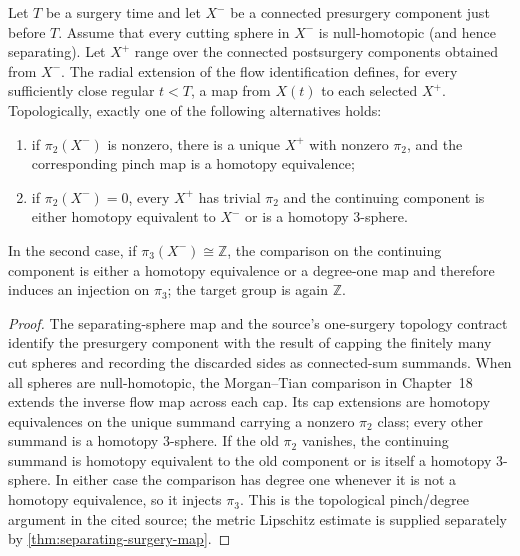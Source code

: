\begin{lemma}
\label{lem:null-sphere-surgery-topological-comparison}
\notready
Let $T$ be a surgery time and let $X^-$ be a connected presurgery
component just before $T$.  Assume that every cutting sphere in $X^-$ is
null-homotopic (and hence separating).  Let $X^+$ range over the connected
postsurgery components obtained from $X^-$.  The radial extension of the
flow identification defines, for every sufficiently close regular
$t<T$, a map from $X(t)$ to each selected $X^+$.  Topologically, exactly one
of the following alternatives holds:
\begin{enumerate}
\item if $\pi _2(X^-)$ is nonzero, there is a unique $X^+$ with nonzero
      $\pi _2$, and the corresponding pinch map is a homotopy equivalence;
\item if $\pi _2(X^-)=0$, every $X^+$ has trivial $\pi _2$ and the
      continuing component is either homotopy equivalent to $X^-$ or is a
      homotopy $3$-sphere.
\end{enumerate}
In the second case, if $\pi _3(X^-)\cong\mathbb Z$, the comparison on the
continuing component is either a homotopy equivalence or a degree-one map
and therefore induces an injection on $\pi _3$; the target group is again
$\mathbb Z$.
\end{lemma}

\begin{proof}
The separating-sphere map and the source's one-surgery topology contract
identify the presurgery component with the result of capping the finitely
many cut spheres and recording the discarded sides as connected-sum summands.
When all spheres are null-homotopic, the Morgan--Tian comparison in
Chapter~18 extends the inverse flow map across each cap.  Its cap extensions
are homotopy equivalences on the unique summand carrying a nonzero
$\pi _2$ class; every other summand is a homotopy $3$-sphere.  If the old
$\pi _2$ vanishes, the continuing summand is homotopy equivalent to the old
component or is itself a homotopy $3$-sphere.  In either case the comparison
has degree one whenever it is not a homotopy equivalence, so it injects
$\pi _3$.  This is the topological pinch/degree argument in the cited
source; the metric Lipschitz estimate is supplied separately by
\ref{thm:separating-surgery-map}.
\end{proof}

